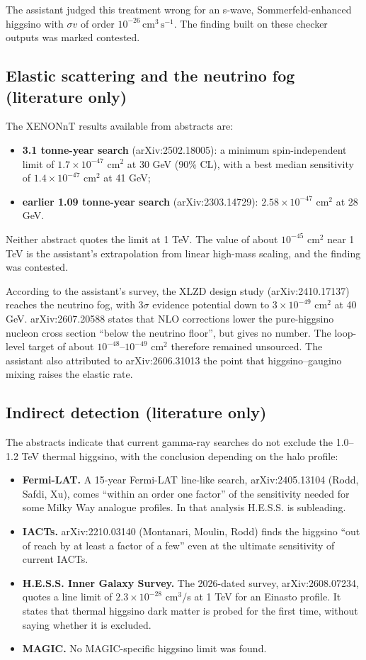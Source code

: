 \documentclass[11pt,a4paper]{article}
\begin{document}
The assistant judged this treatment wrong for an s-wave, Sommerfeld-enhanced higgsino with $\sigma v$ of order $10^{-26}\,\mathrm{cm^3\,s^{-1}}$. The finding built on these checker outputs was marked contested.

\subsection{Elastic scattering and the neutrino fog (literature only)}
The XENONnT results available from abstracts are:
\begin{itemize}
\item \textbf{3.1 tonne-year search} (arXiv:2502.18005): a minimum spin-independent limit of $1.7\times10^{-47}$ cm$^2$ at 30 GeV (90\% CL), with a best median sensitivity of $1.4\times10^{-47}$ cm$^2$ at 41 GeV;
\item \textbf{earlier 1.09 tonne-year search} (arXiv:2303.14729): $2.58\times10^{-47}$ cm$^2$ at 28 GeV.
\end{itemize}
Neither abstract quotes the limit at 1 TeV. The value of about $10^{-45}$ cm$^2$ near 1 TeV is the assistant's extrapolation from linear high-mass scaling, and the finding was contested.

According to the assistant's survey, the XLZD design study (arXiv:2410.17137) reaches the neutrino fog, with $3\sigma$ evidence potential down to $3\times10^{-49}$ cm$^2$ at 40 GeV. arXiv:2607.20588 states that NLO corrections lower the pure-higgsino nucleon cross section ``below the neutrino floor'', but gives no number. The loop-level target of about $10^{-48}$--$10^{-49}$ cm$^2$ therefore remained unsourced. The assistant also attributed to arXiv:2606.31013 the point that higgsino--gaugino mixing raises the elastic rate.

\subsection{Indirect detection (literature only)}
The abstracts indicate that current gamma-ray searches do not exclude the 1.0--1.2 TeV thermal higgsino, with the conclusion depending on the halo profile:
\begin{itemize}
\item \textbf{Fermi-LAT.} A 15-year Fermi-LAT line-like search, arXiv:2405.13104 (Rodd, Safdi, Xu), comes ``within an order one factor'' of the sensitivity needed for some Milky Way analogue profiles. In that analysis H.E.S.S. is subleading.
\item \textbf{IACTs.} arXiv:2210.03140 (Montanari, Moulin, Rodd) finds the higgsino ``out of reach by at least a factor of a few'' even at the ultimate sensitivity of current IACTs.
\item \textbf{H.E.S.S. Inner Galaxy Survey.} The 2026-dated survey, arXiv:2608.07234, quotes a line limit of $2.3\times10^{-28}$ cm$^3$/s at 1 TeV for an Einasto profile. It states that thermal higgsino dark matter is probed for the first time, without saying whether it is excluded.
\item \textbf{MAGIC.} No MAGIC-specific higgsino limit was found.
\end{itemize}
\end{document}
